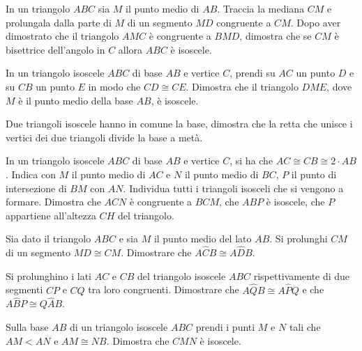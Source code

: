 \begin{multicols}{2}
\begin{esercizio}
\label{ese:2.44}
In un triangolo \(ABC\) sia \(M\) il punto medio di \(AB\). Traccia la 
mediana \(CM\) e prolungala dalla parte di \(M\) di un segmento \(MD\) 
congruente a \(CM\). Dopo aver dimostrato che il triangolo \(AMC\) è 
congruente a \(BMD\), dimostra che se \(CM\) è bisettrice dell'angolo in 
\(C\) allora \(ABC\) è isoscele.
\end{esercizio}

\begin{esercizio}
\label{ese:2.45}
In un triangolo isoscele \(ABC\) di base \(AB\) e vertice \(C\), prendi su 
\(AC\) un punto \(D\) e su \(CB\) un punto \(E\) in modo che \(CD\cong CE\). 
Dimostra che il triangolo \(DME\), dove \(M\) è il punto medio della base 
\(AB\), è isoscele.
\end{esercizio}

\begin{esercizio}
\label{ese:2.46}
Due triangoli isoscele hanno in comune la base, dimostra che la retta 
che unisce i vertici dei due triangoli divide la base a metà.
\end{esercizio}

\begin{esercizio}
\label{ese:2.47}
In un triangolo isoscele \(ABC\) di base \(AB\) e vertice \(C\), si ha che 
\(AC\cong CB\cong 2\cdot AB\). Indica con \(M\) il punto medio di \(AC\) e 
\(N\) il punto medio di \(BC\), \(P\) il punto di intersezione di \(BM\) con 
\(AN\). Individua tutti i triangoli isosceli che si vengono a formare. 
Dimostra che \(ACN\) è congruente a \(BCM\), che \(ABP\) è isoscele, che 
\(P\) appartiene all'altezza \(CH\) del triangolo.
\end{esercizio}

\begin{esercizio}
\label{ese:2.48}
Sia dato il triangolo \(ABC\) e sia \(M\) il punto medio del lato \(AB\). 
Si prolunghi \(CM\) di un segmento \(MD\cong CM\). Dimostrare che 
\(A\widehat{C}B\cong A\widehat{D}B\).
\end{esercizio}

\begin{esercizio}
\label{ese:2.49}
Si prolunghino i lati \(AC\) e \(CB\) del triangolo isoscele \(ABC\) 
rispettivamente di due segmenti \(CP\) e \(CQ\) tra loro congruenti. 
Dimostrare che \(A\widehat{Q}B\cong A\widehat{P}Q\) e che 
\(A\widehat{B}P\cong Q\widehat{A}B\).
\end{esercizio}

\begin{esercizio}
\label{ese:2.50}
Sulla base \(AB\) di un triangolo isoscele \(ABC\) prendi i punti \(M\) e 
\(N\) tali che \(AM<AN\) e \(AM\cong NB\). Dimostra che \(CMN\) è isoscele.
\end{esercizio}


\end{multicols}
